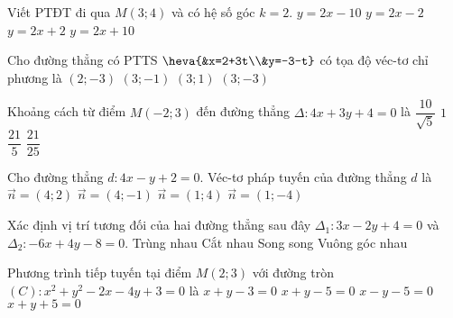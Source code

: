 	\begin{ex}%
		Viết PTĐT đi qua $M\left( 3;4 \right)$ và có hệ số góc $k=2$. 
		\choice
		{$y=2x-10$}
		{\True $y=2x-2$}
		{$y=2x+2$}
		{$y=2x+10$}
	\end{ex}
	
	

\begin{ex}%
	Cho đường thẳng có PTTS $\heva{&x=2+3t\\&y=-3-t}$ có tọa độ véc-tơ chỉ phương là
	\choice
	{$\left(2;-3\right)$}
	{\True $\left(3;-1\right)$}
	{$\left(3;1\right)$}
	{$\left(3;-3\right)$}
\end{ex}
\begin{ex}%
	Khoảng cách từ điểm $M(-2;3)$ đến đường thẳng $\Delta \colon 4x+3y+4=0$ là
	\choice
	{$\dfrac{10}{\sqrt{5}}$}
	{\True $1$}
	{$\dfrac{21}{5}$}
	{$\dfrac{21}{25}$}
\end{ex}
\begin{ex}%
	Cho đường thẳng $d \colon 4x-y+2=0$. Véc-tơ pháp tuyến của đường thẳng $d$ là
	\choice
	{$\overrightarrow{n}=(4;2)$}
	{\True $\overrightarrow{n}=(4;-1)$}
	{$\overrightarrow{n}=(1;4)$}
	{$\overrightarrow{n}=(1;-4)$}
\end{ex}
\begin{ex}%
	Xác định vị trí tương đối của hai đường thẳng sau đây $\Delta_1 \colon 3x-2y+4=0$ và \break $\Delta_2 \colon -6x+4y-8=0$.
	\choice
	{\True Trùng nhau}
	{Cắt nhau}
	{Song song}
	{Vuông góc nhau}
\end{ex}
\begin{ex}%
	Phương trình tiếp tuyến tại điểm $M(2;3)$ với đường tròn $(C) \colon x^2+y^2-2x-4y+3=0$ là
	\choice
	{$x+y-3=0$}
	{\True $x+y-5=0$}
	{$x-y-5=0$}
	{$x+y+5=0$}
\end{ex}

